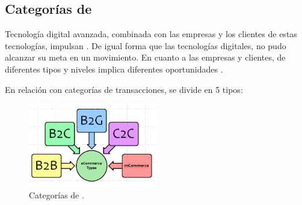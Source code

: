 \subsection{Categorías de \ecommerceCOM}

Tecnología digital avanzada, combinada con las empresas y los clientes de estas tecnologías, impulsan \ecommerceCOM. De igual forma que las tecnologías digitales, \ecommerceCOM no pudo alcanzar su meta en un movimiento. En cuanto a las empresas y clientes, \ecommerceCOM de diferentes tipos y niveles implica diferentes oportunidades \cite{zheng2009fundamentals}.

En relación con categorías de transacciones, \ecommerceCOM se divide en 5 tipos:
\begin{figure}[h!]
	\centering
	\includegraphics[width=0.5\textwidth]{figuras/ecommerce_types.png}
	\caption{Categorías de \ecommerceCOM.}
\end{figure}

